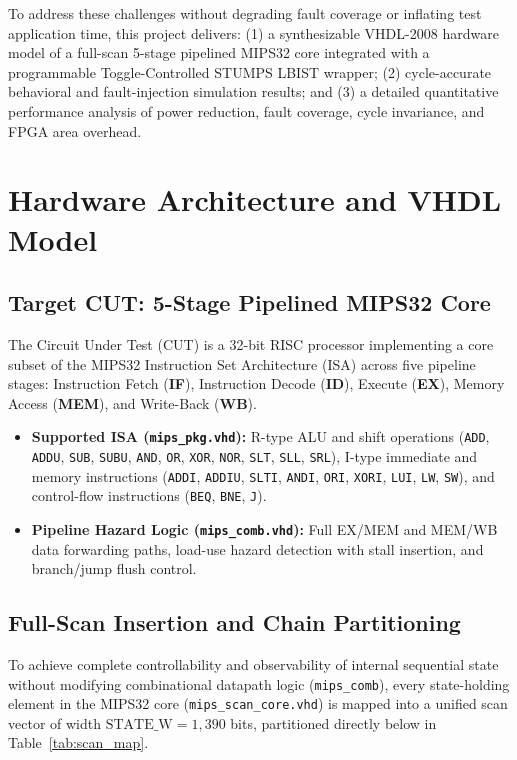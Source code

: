 \documentclass[conference]{IEEEtran}
\begin{document}
To address these challenges without degrading fault coverage or inflating test application time, this project delivers: (1) a synthesizable VHDL-2008 hardware model of a full-scan 5-stage pipelined MIPS32 core integrated with a programmable Toggle-Controlled STUMPS LBIST wrapper; (2) cycle-accurate behavioral and fault-injection simulation results; and (3) a detailed quantitative performance analysis of power reduction, fault coverage, cycle invariance, and FPGA area overhead.

\section{Hardware Architecture and VHDL Model}

\subsection{Target CUT: 5-Stage Pipelined MIPS32 Core}
The Circuit Under Test (CUT) is a 32-bit RISC processor implementing a core subset of the MIPS32 Instruction Set Architecture (ISA) across five pipeline stages: Instruction Fetch (\textbf{IF}), Instruction Decode (\textbf{ID}), Execute (\textbf{EX}), Memory Access (\textbf{MEM}), and Write-Back (\textbf{WB}).
\begin{itemize}
    \item \textbf{Supported ISA (\texttt{mips\_pkg.vhd}):} R-type ALU and shift operations (\texttt{ADD}, \texttt{ADDU}, \texttt{SUB}, \texttt{SUBU}, \texttt{AND}, \texttt{OR}, \texttt{XOR}, \texttt{NOR}, \texttt{SLT}, \texttt{SLL}, \texttt{SRL}), I-type immediate and memory instructions (\texttt{ADDI}, \texttt{ADDIU}, \texttt{SLTI}, \texttt{ANDI}, \texttt{ORI}, \texttt{XORI}, \texttt{LUI}, \texttt{LW}, \texttt{SW}), and control-flow instructions (\texttt{BEQ}, \texttt{BNE}, \texttt{J}).
    \item \textbf{Pipeline Hazard Logic (\texttt{mips\_comb.vhd}):} Full EX/MEM and MEM/WB data forwarding paths, load-use hazard detection with stall insertion, and branch/jump flush control.
\end{itemize}

\subsection{Full-Scan Insertion and Chain Partitioning}
To achieve complete controllability and observability of internal sequential state without modifying combinational datapath logic (\texttt{mips\_comb}), every state-holding element in the MIPS32 core (\texttt{mips\_scan\_core.vhd}) is mapped into a unified scan vector of width $\text{STATE\_W} = 1,390$ bits, partitioned directly below in Table~\ref{tab:scan_map}.
\end{document}
